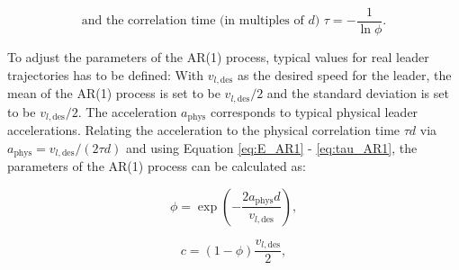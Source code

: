 \documentclass[review]{elsarticle}
\providecommand{\sub}[1]{_{\mathrm{#1}}}  %
\providecommand{\3}{{\ss}}
\begin{document}
\begin{equation}
\label{eq:tau_AR1}
\text{and the correlation time (in multiples of $d$) }\tau = -\frac{1}{\ln \phi}. 
\end{equation}
 
To adjust the parameters of the AR(1) process, typical values for real
leader trajectories has to be defined: With $v_{l,\text{des}}$ as the
desired speed for the leader, the mean of the AR(1) process is set to
be $v_{l,\text{des}}/2$ and the standard deviation is set to be
$v_{l,\text{des}}/2$. The acceleration $a\sub{phys}$ corresponds to
typical physical leader accelerations. Relating the acceleration to
the physical correlation time $\tau d$ via 
$a\sub{phys}=v_{l,\text{des}}/(2\tau d)$  and using Equation \eqref{eq:E_AR1} - \eqref{eq:tau_AR1}, the parameters of the AR(1) process can be calculated as:

\begin{equation}
\phi = \exp\left(-\frac{2a\sub{phys}d}{v_{l,\text{des}}}\right),
\end{equation}

\begin{equation}
c=(1-\phi)\frac{v_{l,\text{des}}}{2},
\end{equation}
\end{document}
